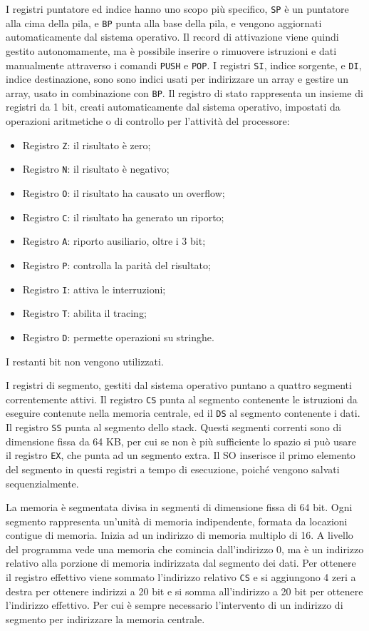 \documentclass{article}
\numberwithin{equation}{subsection}
\begin{document}
I registri puntatore ed indice hanno uno scopo più specifico, \verb|SP| è un puntatore alla cima della pila, e \verb|BP| punta alla base della pila, e vengono aggiornati automaticamente 
dal sistema operativo. Il record di attivazione viene quindi gestito autonomamente, ma è possibile inserire o rimuovere istruzioni e dati manualmente attraverso i comandi \verb|PUSH| e \verb|POP|. 
I registri \verb|SI|, indice sorgente, e \verb|DI|, indice destinazione, sono sono indici usati per indirizzare un array e gestire un array, usato in combinazione con \verb|BP|. 
Il registro di stato rappresenta un insieme di registri da 1 bit, creati automaticamente dal sistema operativo, impostati da operazioni aritmetiche o di controllo per l'attività del processore:  
\begin{itemize}
    \item Registro \verb|Z|: il risultato è zero;
    \item Registro \verb|N|: il risultato è negativo;
    \item Registro \verb|O|: il risultato ha causato un overflow;
    \item Registro \verb|C|: il risultato ha generato un riporto;
    \item Registro \verb|A|: riporto ausiliario, oltre i 3 bit;
    \item Registro \verb|P|: controlla la parità del risultato;
    \item Registro \verb|I|: attiva le interruzioni;
    \item Registro \verb|T|: abilita il tracing;
    \item Registro \verb|D|: permette operazioni su stringhe.  
\end{itemize}
I restanti bit non vengono utilizzati. 



I registri di segmento, gestiti dal sistema operativo puntano a quattro segmenti correntemente attivi. Il registro \verb|CS| punta al segmento contenente le istruzioni da eseguire 
contenute nella memoria centrale, ed il \verb|DS| al segmento contenente i dati. Il registro \verb|SS| punta al segmento dello stack. 
Questi segmenti correnti sono di dimensione fissa da 64 KB, per cui se non è più sufficiente lo spazio si può usare il registro \verb|EX|, che punta ad un segmento extra. 
Il SO inserisce il primo elemento del segmento in questi registri a tempo di esecuzione, poiché vengono salvati sequenzialmente. 

La memoria è segmentata divisa in segmenti di dimensione fissa di 64 bit. Ogni segmento rappresenta un'unità di memoria indipendente, formata da locazioni contigue di memoria. 
Inizia ad un indirizzo di memoria multiplo di 16. A livello del programma vede una memoria che comincia dall'indirizzo 0, ma è un indirizzo relativo 
alla porzione di memoria indirizzata dal segmento dei dati. Per ottenere il registro effettivo viene sommato l'indirizzo relativo \verb|CS| e si aggiungono 4 zeri a destra per ottenere 
indirizzi a 20 bit e si somma all'indirizzo a 20 bit per ottenere l'indirizzo effettivo. Per cui è sempre necessario l'intervento di un indirizzo di segmento per indirizzare la memoria 
centrale. 
\end{document}
